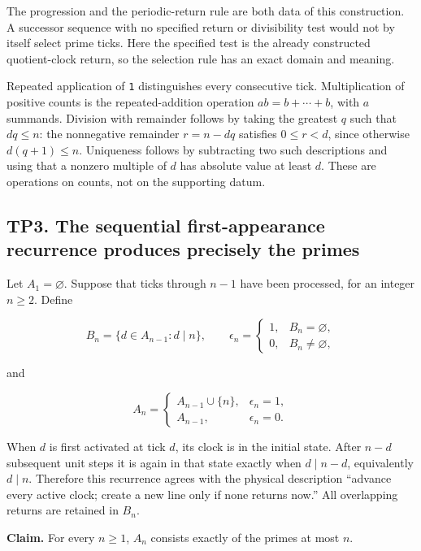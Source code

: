 \documentclass[
]{article}
\newcounter{none} %
\begin{document}
The progression and the periodic-return rule are both data of this
construction. A successor sequence with no specified return or
divisibility test would not by itself select prime ticks. Here the
specified test is the already constructed quotient-clock return, so the
selection rule has an exact domain and meaning.

Repeated application of \texttt{1} distinguishes every consecutive tick.
Multiplication of positive counts is the repeated-addition operation
\(a b=b+\cdots+b\), with \(a\) summands. Division with remainder follows
by taking the greatest \(q\) such that \(dq\le n\): the nonnegative
remainder \(r=n-dq\) satisfies \(0\le r<d\), since otherwise
\(d(q+1)\le n\). Uniqueness follows by subtracting two such descriptions
and using that a nonzero multiple of \(d\) has absolute value at least
\(d\). These are operations on counts, not on the supporting datum.

\subsection{TP3. The sequential first-appearance recurrence produces
precisely the
primes}\label{tp3.-the-sequential-first-appearance-recurrence-produces-precisely-the-primes}

Let \(A_1=\varnothing\). Suppose that ticks through \(n-1\) have been
processed, for an integer \(n\ge2\). Define

\[
B_n=\{d\in A_{n-1}:d\mid n\},
\qquad
\epsilon_n=\begin{cases}1,&B_n=\varnothing,\\0,&B_n\ne\varnothing,\end{cases}
\]

and

\[
A_n=\begin{cases}A_{n-1}\cup\{n\},&\epsilon_n=1,\\A_{n-1},&\epsilon_n=0.\end{cases}
\]

When \(d\) is first activated at tick \(d\), its clock is in the initial
state. After \(n-d\) subsequent unit steps it is again in that state
exactly when \(d\mid n-d\), equivalently \(d\mid n\). Therefore this
recurrence agrees with the physical description ``advance every active
clock; create a new line only if none returns now.'' All overlapping
returns are retained in \(B_n\).

\textbf{Claim.} For every \(n\ge1\), \(A_n\) consists exactly of the
primes at most \(n\).
\end{document}
